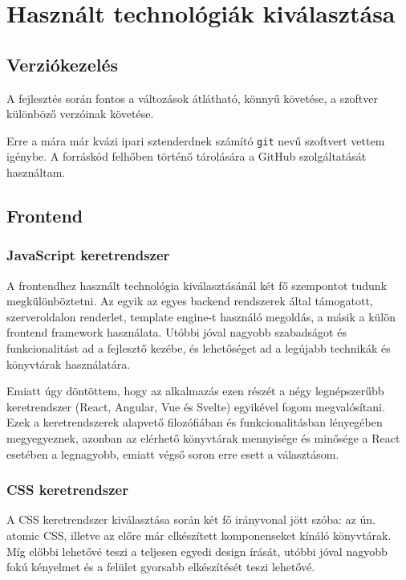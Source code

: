 \chapter{Használt technológiák kiválasztása}

\section{Verziókezelés}

A fejlesztés során fontos a változások átlátható, könnyű követése, a szoftver különböző verzóinak követése.

Erre a mára már kvázi ipari sztenderdnek számító \lstinline|git| nevű szoftvert vettem igénybe. A forráskód felhőben
történő tárolására a GitHub szolgáltatását használtam.

\section{Frontend}
\subsection{JavaScript keretrendszer}
A frontendhez használt technológia kiválasztásánál két fő szempontot tudunk megkülönböztetni.
Az egyik az egyes backend rendszerek által támogatott, szerveroldalon renderlet, template engine-t használó megoldás, a másik a külön frontend framework használata.
Utóbbi jóval nagyobb szabadságot és funkcionalitást ad a fejlesztő kezébe, és lehetőséget ad a legújabb technikák és könyvtárak használatára.

Emiatt úgy döntöttem, hogy az alkalmazás ezen részét a négy legnépszerűbb keretrendszer (React, Angular, Vue és Svelte) egyikével fogom megvalósítani.
Ezek a keretrendszerek alapvető filozófiában és funkcionalitásban lényegében megyegyeznek, azonban az elérhető könyvtárak mennyisége és minősége a React esetében a legnagyobb, emiatt végső soron erre esett a választásom.

\subsection{CSS keretrendszer}
A CSS keretrendszer kiválasztása során két fő irányvonal jött szóba: az ún. atomic CSS, illetve az előre már elkészített komponenseket kínáló könyvtárak.
Míg előbbi lehetővé teszi a teljesen egyedi design írását, utóbbi jóval nagyobb fokú kényelmet és a felület gyorsabb elkészítését teszi lehetővé.


